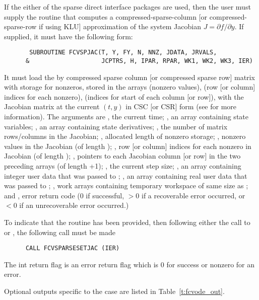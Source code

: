 \begin{Steps}
  If the either of the sparse direct interface packages are used, 
  then the user must supply the  routine
  that computes a compressed-sparse-column [or compressed-sparse-row if using KLU]
  approximation of the system Jacobian $J = \partial f / \partial y$.  If supplied, 
  it must have the following form:
\begin{verbatim}
       SUBROUTINE FCVSPJAC(T, Y, FY, N, NNZ, JDATA, JRVALS, 
      &                    JCPTRS, H, IPAR, RPAR, WK1, WK2, WK3, IER)
\end{verbatim}
  It must load the  by  
  compressed sparse column [or compressed sparse row] matrix 
  with storage for  nonzeros, stored in the arrays  (nonzero
  values),  (row [or column] indices for each nonzero),  (indices 
  for start of each column [or row]), with the Jacobian matrix at the current
  $(t, y)$ in CSC [or CSR] form (see  for more information).
 The arguments are , the current time; , an array containing 
 state variables; , an
 array containing state derivatives; , the number of matrix rows/columns 
 in the Jacobian; , allocated length of nonzero storage; ,
 nonzero values in the Jacobian (of length ); 
 , row [or column] indices for each nonzero in Jacobian (of length );
 , pointers to each Jacobian column [or row] in the two preceding arrays
 (of length +1); , the current step size;
 , an array containing integer user data that was 
 passed to ; , an array containing real user 
 data that was passed to ;
 , work arrays containing temporary workspace 
 of same size as ; and , error return code (0 if successful,
 $>0$ if a recoverable error occurred, or $<0$ if an unrecoverable error occurred.)

  To indicate that the  routine has been provided, then
  following either the call to  or , the
  following call must be made    
\begin{verbatim}
      CALL FCVSPARSESETJAC (IER)
\end{verbatim}
  The int return flag  is an error return flag which is $0$
  for success or nonzero for an error.

  Optional outputs specific to the {\sparse} case are listed in
  Table~\ref{t:fcvode_out}.


\end{Steps}
